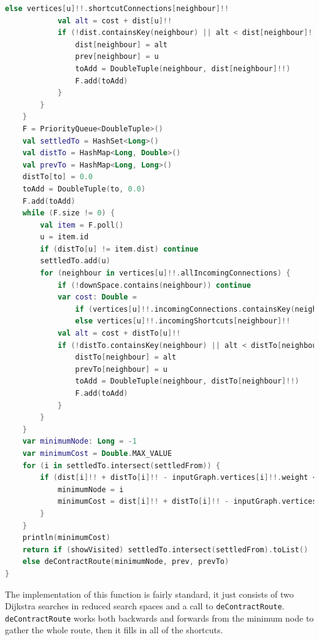 \documentclass[11pt,twoside,a4paper]{report}
\begin{document}
\begin{lstlisting}[language=kotlin]
                else vertices[u]!!.shortcutConnections[neighbour]!!
            val alt = cost + dist[u]!!
            if (!dist.containsKey(neighbour) || alt < dist[neighbour]!!) {
                dist[neighbour] = alt
                prev[neighbour] = u
                toAdd = DoubleTuple(neighbour, dist[neighbour]!!)
                F.add(toAdd)
            }
        }
    }
    F = PriorityQueue<DoubleTuple>()
    val settledTo = HashSet<Long>()
    val distTo = HashMap<Long, Double>()
    val prevTo = HashMap<Long, Long>()
    distTo[to] = 0.0
    toAdd = DoubleTuple(to, 0.0)
    F.add(toAdd)
    while (F.size != 0) {
        val item = F.poll()
        u = item.id
        if (distTo[u] != item.dist) continue
        settledTo.add(u)
        for (neighbour in vertices[u]!!.allIncomingConnections) {
            if (!downSpace.contains(neighbour)) continue
            var cost: Double =
                if (vertices[u]!!.incomingConnections.containsKey(neighbour)) vertices[u]!!.incomingConnections[neighbour]!!
                else vertices[u]!!.incomingShortcuts[neighbour]!!
            val alt = cost + distTo[u]!!
            if (!distTo.containsKey(neighbour) || alt < distTo[neighbour]!!) {
                distTo[neighbour] = alt
                prevTo[neighbour] = u
                toAdd = DoubleTuple(neighbour, distTo[neighbour]!!)
                F.add(toAdd)
            }
        }
    }
    var minimumNode: Long = -1
    var minimumCost = Double.MAX_VALUE
    for (i in settledTo.intersect(settledFrom)) {
        if (dist[i]!! + distTo[i]!! - inputGraph.vertices[i]!!.weight < minimumCost) {
            minimumNode = i
            minimumCost = dist[i]!! + distTo[i]!! - inputGraph.vertices[i]!!.weight
        }
    }
    println(minimumCost)
    return if (showVisited) settledTo.intersect(settledFrom).toList()
    else deContractRoute(minimumNode, prev, prevTo)
}
\end{lstlisting}
The implementation of this function is fairly standard, it just consists of two Dijkstra searches in reduced search spaces and a call to \texttt{deContractRoute}. \texttt{deContractRoute} works both backwards and forwards from the minimum node to gather the whole route, then it fills in all of the shortcuts.
\end{document}
